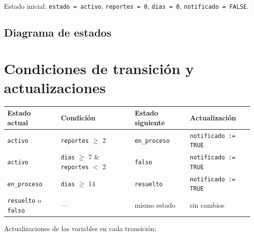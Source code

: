 \documentclass[11pt,a4paper]{article}
\begin{document}
Estado inicial: \texttt{estado = activo}, \texttt{reportes = 0}, \texttt{dias = 0}, \texttt{notificado = FALSE}.

\subsection{Diagrama de estados}

\begin{center}
\end{center}

\section{Condiciones de transición y actualizaciones}

\begin{center}
\begin{tabular}{|l|l|l|l|}
\hline
\textbf{Estado actual} & \textbf{Condición} & \textbf{Estado siguiente} & \textbf{Actualización} \\
\hline
\texttt{activo} & \texttt{reportes} $\ge$ 2 & \texttt{en\_proceso} & \texttt{notificado := TRUE} \\
\hline
\texttt{activo} & \texttt{dias} $\ge$ 7 \& \texttt{reportes} $<$ 2 & \texttt{falso} & \texttt{notificado := TRUE} \\
\hline
\texttt{en\_proceso} & \texttt{dias} $\ge$ 14 & \texttt{resuelto} & \texttt{notificado := TRUE} \\
\hline
\texttt{resuelto} o \texttt{falso} & --- & mismo estado & sin cambios \\
\hline
\end{tabular}
\end{center}

Actualizaciones de las variables en cada transición:
\end{document}
